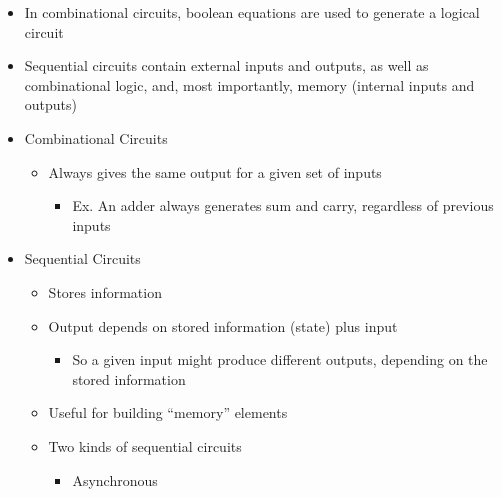 \begin{itemize}

  \item In combinational circuits, boolean equations are used to generate a logical circuit

  \item Sequential circuits contain external inputs and outputs, as well as combinational logic, and, most importantly, memory (internal inputs and outputs)

  \item Combinational Circuits

    \begin{itemize}

      \item Always gives the same output for a given set of inputs

        \begin{itemize}

          \item Ex. An adder always generates sum and carry, regardless of previous inputs

        \end{itemize}

    \end{itemize}

  \item Sequential Circuits

    \begin{itemize}

      \item Stores information

      \item Output depends on stored information (state) plus input

        \begin{itemize}

          \item So a given input might produce different outputs, depending on the stored information

        \end{itemize}

      \item Useful for building ``memory'' elements

      \item Two kinds of sequential circuits

        \begin{itemize}

          \item Asynchronous


\end{itemize}
\end{itemize}
\end{itemize}
